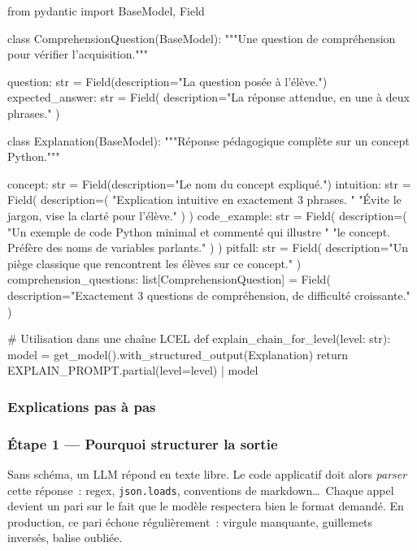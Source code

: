 \documentclass[11pt,a4paper]{article}
\begin{document}
\begin{pythoncode}
from pydantic import BaseModel, Field

class ComprehensionQuestion(BaseModel):
    """Une question de compréhension pour vérifier l'acquisition."""

    question: str = Field(description="La question posée à l'élève.")
    expected_answer: str = Field(
        description="La réponse attendue, en une à deux phrases."
    )


class Explanation(BaseModel):
    """Réponse pédagogique complète sur un concept Python."""

    concept: str = Field(description="Le nom du concept expliqué.")
    intuition: str = Field(
        description=(
            "Explication intuitive en exactement 3 phrases. "
            "Évite le jargon, vise la clarté pour l'élève."
        )
    )
    code_example: str = Field(
        description=(
            "Un exemple de code Python minimal et commenté qui illustre "
            "le concept. Préfère des noms de variables parlants."
        )
    )
    pitfall: str = Field(
        description="Un piège classique que rencontrent les élèves sur ce concept."
    )
    comprehension_questions: list[ComprehensionQuestion] = Field(
        description="Exactement 3 questions de compréhension, de difficulté croissante."
    )


# Utilisation dans une chaîne LCEL
def explain_chain_for_level(level: str):
    model = get_model().with_structured_output(Explanation)
    return EXPLAIN_PROMPT.partial(level=level) | model
\end{pythoncode}

\subsubsection{Explications pas à pas}

\subsubsection*{Étape 1 — Pourquoi structurer la sortie}

Sans schéma, un LLM répond en texte libre. Le code applicatif doit alors
\emph{parser} cette réponse~: regex, \texttt{json.loads}, conventions de
markdown\dots\ Chaque appel devient un pari sur le fait que le modèle
respectera bien le format demandé. En production, ce pari échoue
régulièrement~: virgule manquante, guillemets inversés, balise oubliée.
\end{document}
